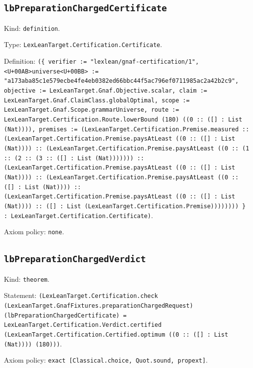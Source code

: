 \documentclass[11pt]{article}
\begin{document}
\subsection*{\texttt{lbPreparationChargedCertificate}}
\noindent Kind: \texttt{definition}.\par
\noindent Type: \texttt{LexLeanTarget.Certification.Certificate}.\par
\noindent Definition: \texttt{(\{ verifier := "lexlean/gnaf-certification/1", <U+00AB>universe<U+00BB> := "a173aba85c1e579ecbe4fe4eb0382ed66bbc44f5ac796ef0711985ac2a42b2c9", objective := LexLeanTarget.Gnaf.Objective.scalar, claim := LexLeanTarget.Gnaf.ClaimClass.globalOptimal, scope := LexLeanTarget.Gnaf.Scope.grammarUniverse, route := LexLeanTarget.Certification.Route.lowerBound (180) ((0 :: ([] : List (Nat)))), premises := (LexLeanTarget.Certification.Premise.measured :: (LexLeanTarget.Certification.Premise.paysAtLeast ((0 :: ([] : List (Nat)))) :: (LexLeanTarget.Certification.Premise.paysAtLeast ((0 :: (1 :: (2 :: (3 :: ([] : List (Nat))))))) :: (LexLeanTarget.Certification.Premise.paysAtLeast ((0 :: ([] : List (Nat)))) :: (LexLeanTarget.Certification.Premise.paysAtLeast ((0 :: ([] : List (Nat)))) :: (LexLeanTarget.Certification.Premise.paysAtLeast ((0 :: ([] : List (Nat)))) :: ([] : List (LexLeanTarget.Certification.Premise)))))))) \} : LexLeanTarget.Certification.Certificate)}.\par
\noindent Axiom policy: \texttt{none}.\par
\subsection*{\texttt{lbPreparationChargedVerdict}}
\noindent Kind: \texttt{theorem}.\par
\noindent Statement: \texttt{(LexLeanTarget.Certification.check (LexLeanTarget.GnafFixtures.preparationChargedRequest) (lbPreparationChargedCertificate) = LexLeanTarget.Certification.Verdict.certified (LexLeanTarget.Certification.Certified.optimum ((0 :: ([] : List (Nat)))) (180)))}.\par
\noindent Axiom policy: \texttt{exact [Classical.choice, Quot.sound, propext]}.\par
\end{document}
